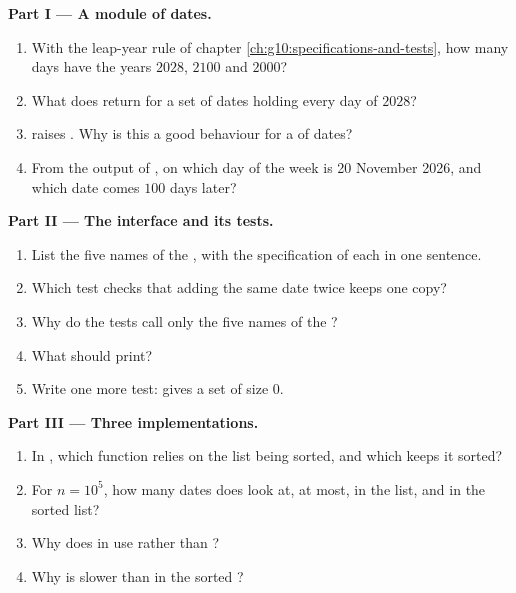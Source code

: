 \begin{problem}
\medskip\noindent\textbf{Part I --- A module of dates.}
\begin{enumerate}
  \item With the leap-year rule of chapter \ref{ch:g10:specifications-and-tests}, how many days have the years $2028$,
    $2100$ and $2000$?
  \item What does  return for a set of dates holding every day of $2028$?
  \item {} raises . Why is this a good
    behaviour for a  of dates?
  \item From the output of , on which day of the week is 20 November 2026, and which date comes
    $100$ days later?
\end{enumerate}

\medskip\noindent\textbf{Part II --- The interface and its tests.}
\begin{enumerate}[resume]
  \item List the five names of the , with the specification of each in one sentence.
  \item Which test checks that adding the same date twice keeps one copy?
  \item Why do the tests call only the five names of the ?
  \item What should  print?
  \item Write one more test:  gives a set of size $0$.
\end{enumerate}

\medskip\noindent\textbf{Part III --- Three implementations.}
\begin{enumerate}[resume]
  \item In , which function relies on the list being sorted, and which keeps it sorted?
  \item For $n = 10^5$, how many dates does  look at, at most, in the list, and in the sorted list?
  \item Why does  in  use  rather than ?
  \item Why is  slower than  in the sorted ?
\end{enumerate}


\end{problem}
